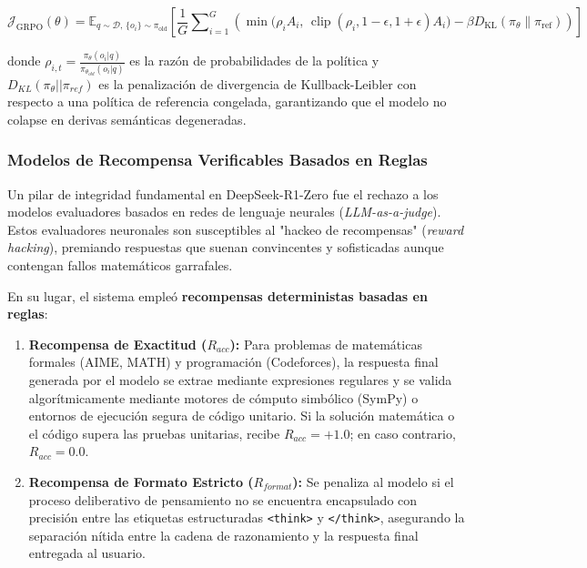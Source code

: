 \begin{equation}
\mathcal{J}_{\mathrm{GRPO}}(\theta) = \mathbb{E}_{q \sim \mathcal{D}, \, \{o_i\} \sim \pi_{\mathrm{old}}} \left[ \frac{1}{G} \sum\nolimits_{i=1}^G \left( \min\bigl( \rho_i A_i, \, \operatorname{clip}(\rho_i, 1-\epsilon, 1+\epsilon) A_i \bigr) - \beta D_{\mathrm{KL}}(\pi_\theta \parallel \pi_{\mathrm{ref}}) \right) \right]
\end{equation}

donde $\rho_{i,t} = \frac{\pi_\theta(o_i|q)}{\pi_{\theta_{old}}(o_i|q)}$ es la razón de probabilidades de la política y $D_{KL}(\pi_\theta || \pi_{ref})$ es la penalización de divergencia de Kullback-Leibler con respecto a una política de referencia congelada, garantizando que el modelo no colapse en derivas semánticas degeneradas.

\subsubsection{Modelos de Recompensa Verificables Basados en Reglas}

Un pilar de integridad fundamental en DeepSeek-R1-Zero fue el rechazo a los modelos evaluadores basados en redes de lenguaje neurales (\textit{LLM-as-a-judge}). Estos evaluadores neuronales son susceptibles al "hackeo de recompensas" (\textit{reward hacking}), premiando respuestas que suenan convincentes y sofisticadas aunque contengan fallos matemáticos garrafales.

En su lugar, el sistema empleó \textbf{recompensas deterministas basadas en reglas}:
\begin{enumerate}
    \item \textbf{Recompensa de Exactitud ($R_{acc}$):} Para problemas de matemáticas formales (AIME, MATH) y programación (Codeforces), la respuesta final generada por el modelo se extrae mediante expresiones regulares y se valida algorítmicamente mediante motores de cómputo simbólico (SymPy) o entornos de ejecución segura de código unitario. Si la solución matemática o el código supera las pruebas unitarias, recibe $R_{acc} = +1.0$; en caso contrario, $R_{acc} = 0.0$.
    \item \textbf{Recompensa de Formato Estricto ($R_{format}$):} Se penaliza al modelo si el proceso deliberativo de pensamiento no se encuentra encapsulado con precisión entre las etiquetas estructuradas \texttt{<think>} y \texttt{</think>}, asegurando la separación nítida entre la cadena de razonamiento y la respuesta final entregada al usuario.
\end{enumerate}

